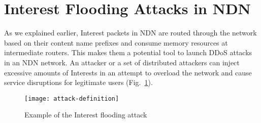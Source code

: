 \section{Interest Flooding Attacks in NDN}
\label{sec:interest-flooding}




As we explained earlier, Interest packets in NDN are routed through the network based on their content name prefixes and consume memory resources at intermediate routers. This makes them a potential tool to launch DDoS attacks in an NDN network. An attacker or a set of distributed attackers can inject excessive amounts of Interests in an attempt to overload the network and cause service disruptions for legitimate users (Fig.~\ref{fig:flooding example}). 

\begin{figure}[htbp]
  \centering
  \texttt{[image: attack-definition]}
  \vspace{-0.4cm}
  \caption{Example of the Interest flooding attack}
  \label{fig:flooding example}
\end{figure}


